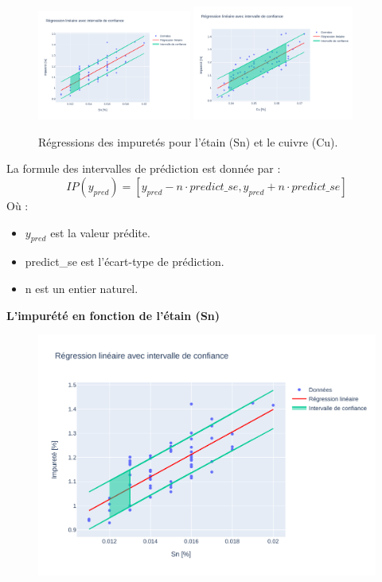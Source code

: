 \documentclass[12pt]{article}
\begin{document}
\begin{figure}[H]
    \centering
    \includegraphics[width=0.45\textwidth]{Images/Statistique/Regression_Impurete_Sn.pdf} 
    \includegraphics[width=0.47\textwidth]{Images/Statistique/Regression_Impurete_Cu.pdf}
    \caption{Régressions des impuretés pour l'étain (Sn) et le cuivre (Cu).}
    \label{fig:regression-impurete}
\end{figure}


\medskip %

La formule des intervalles de prédiction est donnée par :
$$
IP (y_{pred}) = [y_{pred} - n \cdot predict\_se, y_{pred} + n \cdot predict\_se]
$$
Où :
\begin{itemize}
    \item $y_{pred}$ est la valeur prédite.
    \item predict\_se est  l'écart-type de prédiction.
    \item  n  est un entier naturel.
\end{itemize}






\textbf{L'impurété en fonction de l'étain (Sn)} 
\begin{figure}[H]
\includegraphics[width=\textwidth]{Images/Statistique/Regression_Impurete_Sn.pdf} 
\end{figure}
\end{document}
